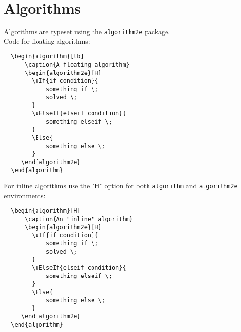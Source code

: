 \chapter{Algorithms}
\noindent Algorithms are typeset using the \texttt{algorithm2e} package.
\\[1cm]
Code for floating algorithms:
\begin{verbatim}
  \begin{algorithm}[tb]
      \caption{A floating algorithm}
      \begin{algorithm2e}[H]
        \uIf{if condition}{
            something if \;
            solved \;
        }
        \uElseIf{elseif condition}{
            something elseif \;
        }
        \Else{
            something else \;
        }
     \end{algorithm2e}
  \end{algorithm}
\end{verbatim}

\begin{algorithm}[tb]
	\caption{A floating algorithm}
    \begin{algorithm2e}[H]
  \end{algorithm2e}
\end{algorithm}
  
  \newpage
  
  \noindent For inline algorithms use the "H" option for both \texttt{algorithm} and \texttt{algorithm2e} environments:
\begin{verbatim}
  \begin{algorithm}[H]
      \caption{An "inline" algorithm}
      \begin{algorithm2e}[H]
        \uIf{if condition}{
            something if \;
            solved \;
        }
        \uElseIf{elseif condition}{
            something elseif \;
        }
        \Else{
            something else \;
        }
     \end{algorithm2e}
  \end{algorithm}
\end{verbatim}

  \begin{algorithm}[H]
      \caption{An "inline" algorithm}
      \begin{algorithm2e}[H]
    \end{algorithm2e}
  \end{algorithm}
  
